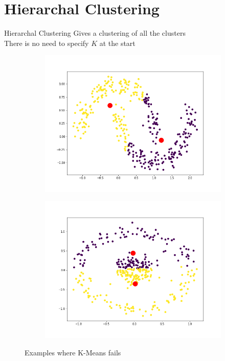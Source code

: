 \documentclass{beamer}
\begin{document}
\section{Hierarchal Clustering}

\begin{frame}{Hierarchal Clustering}
\vspace{1cm}
Gives a clustering of all the clusters \\
\pause
There is no need to specify $K$ at the start
\pause
\vspace{-0.5cm}
\begin{figure}
        \begin{subfigure}[b]{0.5\textwidth}
                \includegraphics[width=\linewidth]{unsupervised/k_bad_1.png}
        \end{subfigure}%
        \begin{subfigure}[b]{0.5\textwidth}
                \includegraphics[width=\linewidth]{unsupervised/k_bad_2.png}
        \end{subfigure}%
        \caption{Examples where K-Means fails}
\end{figure}
\end{frame}
\end{document}
